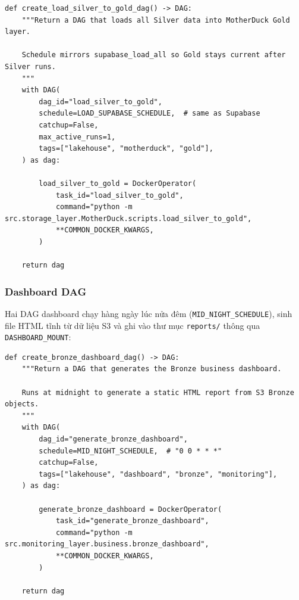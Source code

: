 \begin{lstlisting}[style=pystyle, caption={create\_load\_silver\_to\_gold\_dag — DuckDB đọc S3 parquet, tạo Gold tables}]
def create_load_silver_to_gold_dag() -> DAG:
    """Return a DAG that loads all Silver data into MotherDuck Gold layer.

    Schedule mirrors supabase_load_all so Gold stays current after Silver runs.
    """
    with DAG(
        dag_id="load_silver_to_gold",
        schedule=LOAD_SUPABASE_SCHEDULE,  # same as Supabase
        catchup=False,
        max_active_runs=1,
        tags=["lakehouse", "motherduck", "gold"],
    ) as dag:

        load_silver_to_gold = DockerOperator(
            task_id="load_silver_to_gold",
            command="python -m src.storage_layer.MotherDuck.scripts.load_silver_to_gold",
            **COMMON_DOCKER_KWARGS,
        )

    return dag
\end{lstlisting}

\subsubsection{Dashboard DAG}

Hai DAG dashboard chạy hàng ngày lúc nửa đêm (\texttt{MID\_NIGHT\_SCHEDULE}),
sinh file HTML tĩnh từ dữ liệu S3 và ghi vào thư mục \texttt{reports/} thông qua
\texttt{DASHBOARD\_MOUNT}:

\begin{lstlisting}[style=pystyle, caption={create\_bronze\_dashboard\_dag — sinh HTML report hàng ngày}]
def create_bronze_dashboard_dag() -> DAG:
    """Return a DAG that generates the Bronze business dashboard.

    Runs at midnight to generate a static HTML report from S3 Bronze objects.
    """
    with DAG(
        dag_id="generate_bronze_dashboard",
        schedule=MID_NIGHT_SCHEDULE,  # "0 0 * * *"
        catchup=False,
        tags=["lakehouse", "dashboard", "bronze", "monitoring"],
    ) as dag:

        generate_bronze_dashboard = DockerOperator(
            task_id="generate_bronze_dashboard",
            command="python -m src.monitoring_layer.business.bronze_dashboard",
            **COMMON_DOCKER_KWARGS,
        )

    return dag
\end{lstlisting}

